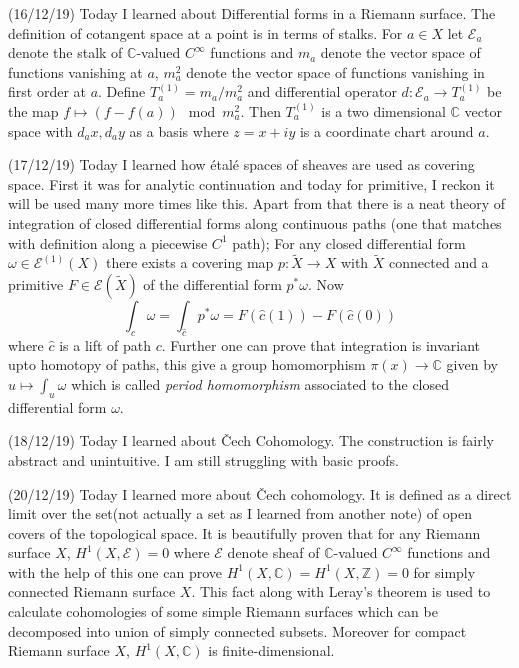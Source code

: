 \documentclass[12pt,a4paper]{article}
\begin{document}
(16/12/19) Today I learned about Differential forms in a Riemann surface. The definition of cotangent space at a point is in terms of stalks. For $a\in X$ let $\mathcal{E}_a$ denote the stalk of $\mathbb{C}$-valued $C^{\infty}$ functions and $m_a$ denote the vector space of functions vanishing at $a$, $m_a^2$ denote the vector space of functions vanishing in first order at $a$. Define $T^{(1)}_a=m_a/m_a^2$ and differential operator $d : \mathcal{E}_a \to T^{(1)}_a$ be the map $f \mapsto (f-f(a)) \mod m_a^2$. Then $T^{(1)}_a$ is a two dimensional $\mathbb{C}$ vector space with $d_ax,d_ay$ as a basis where $z=x+iy$ is a coordinate chart around $a$.

(17/12/19) Today I learned how \'{e}tal\'{e} spaces of sheaves are used as covering space. First it was for analytic continuation and today for primitive, I reckon it will be used many more times like this.
Apart from that there is a neat theory of integration of closed differential forms along continuous paths (one that matches with definition along a piecewise $C^1$ path); For any closed differential form $\omega \in \mathcal{E}^{(1)}(X)$ there exists a covering map $p:\tilde{X} \to X$ with $\tilde{X}$ connected and a primitive $F\in \mathcal{E}(\tilde{X})$ of the differential form $p^*\omega$. Now \[\int_c \omega =\int_{\hat{c}} p^*\omega =  F(\hat{c}(1))-F(\hat{c}(0)) \]
where $\hat{c}$ is a lift of path $c$. Further one can prove that integration is invariant upto homotopy of paths, this give a group homomorphism $\pi (x) \to \mathbb{C}$ given by $u \mapsto \int_u \omega$ which is called \textit{period homomorphism} associated to the closed differential form $\omega$.

(18/12/19) Today I learned about \v{C}ech Cohomology. The construction is fairly abstract and unintuitive. I am still struggling with basic proofs.

(20/12/19) Today I learned more about \v{C}ech cohomology. It is defined as a direct limit over the set(not actually a set as I learned from another note) of open covers of the topological space. It is beautifully proven that for any Riemann surface $X$, $H^1(X,\mathcal{E})=0$ where $\mathcal{E}$ denote sheaf of  $\mathbb{C}$-valued $C^{\infty}$  functions and with the help of this one can prove  $H^1(X,\mathbb{C})=H^1(X,\mathbb{Z})=0$ for simply connected Riemann surface $X$. This fact along with Leray's theorem is used to calculate cohomologies of some simple Riemann surfaces which can be decomposed into union of simply connected subsets. Moreover for compact Riemann surface $X$, $H^1(X,\mathbb{C})$ is finite-dimensional.
\end{document}
